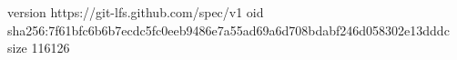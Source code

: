 version https://git-lfs.github.com/spec/v1
oid sha256:7f61bfc6b6b7ecdc5fc0eeb9486e7a55ad69a6d708bdabf246d058302e13dddc
size 116126
